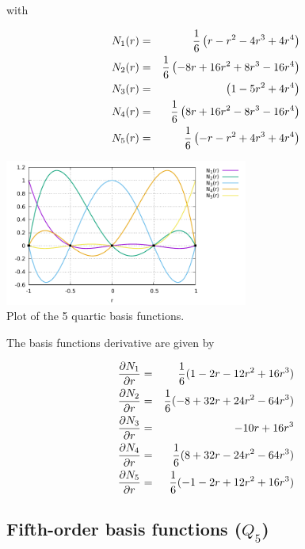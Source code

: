 with 
\begin{mdframed}[backgroundcolor=blue!5]
\begin{eqnarray}
N_1(r)&=& \frac{1}{6} \left(  r- r^2 -4r^3 +4r^4\right) \nonumber\\
N_2(r)&=& \frac{1}{6} \left(  -8r+16 r^2 +8r^3 -16 r^4\right)  \nonumber\\
N_3(r)&=& \left( 1 -5r^2+4r^4  \right) \nonumber \\
N_4(r)&=& \frac{1}{6} \left(  8r+16 r^2 -8r^3 -16 r^4\right)  \nonumber\\
N_5(r)&=& \frac{1}{6} \left(  -r- r^2 +4r^3 +4r^4\right) 
\end{eqnarray}
\end{mdframed}

\begin{center}
\includegraphics[width=8cm]{images/basis1D/quartic.pdf}\\
{\captionfont Plot of the 5 quartic basis functions.}
\end{center}

The basis functions derivative are given by
\begin{mdframed}[backgroundcolor=blue!5]
\begin{eqnarray}
\frac{\partial N_1}{\partial r}&=& \frac{1}{6}(1-2r-12r^2+16r^3) \nonumber\\
\frac{\partial N_2}{\partial r}&=& \frac{1}{6}(-8+32r+24r^2-64r^3) \nonumber\\
\frac{\partial N_3}{\partial r}&=& -10r+16r^3 \nonumber\\
\frac{\partial N_4}{\partial r}&=& \frac{1}{6} (8+32r-24r^2-64r^3) \nonumber\\
\frac{\partial N_5}{\partial r}&=& \frac{1}{6} (-1-2r+12r^2+16r^3) 
\end{eqnarray}
\end{mdframed}


\subsection{Fifth-order basis functions ($Q_5$) \label{sec:bf5}}

